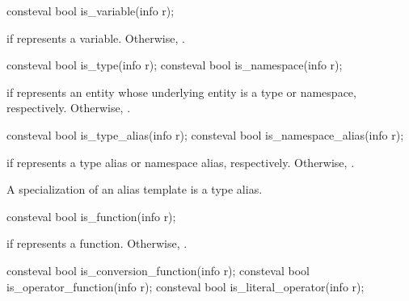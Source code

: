 %
\begin{itemdecl}
consteval bool is_variable(info r);
\end{itemdecl}

\begin{itemdescr}
\pnum
\returns
{} if  represents a variable.
Otherwise, .
\end{itemdescr}

%
%
\begin{itemdecl}
consteval bool is_type(info r);
consteval bool is_namespace(info r);
\end{itemdecl}

\begin{itemdescr}
\pnum
\returns
{} if  represents an entity
whose underlying entity is a type or namespace, respectively.
Otherwise, .
\end{itemdescr}

%
%
\begin{itemdecl}
consteval bool is_type_alias(info r);
consteval bool is_namespace_alias(info r);
\end{itemdecl}

\begin{itemdescr}
\pnum
\returns
{} if  represents a type alias or namespace alias, respectively.
Otherwise, .
\begin{note}
A specialization of an alias template is a type alias.
\end{note}
\end{itemdescr}

%
\begin{itemdecl}
consteval bool is_function(info r);
\end{itemdecl}

\begin{itemdescr}
\pnum
\returns
{} if  represents a function.
Otherwise, .
\end{itemdescr}

%
%
%
\begin{itemdecl}
consteval bool is_conversion_function(info r);
consteval bool is_operator_function(info r);
consteval bool is_literal_operator(info r);
\end{itemdecl}

